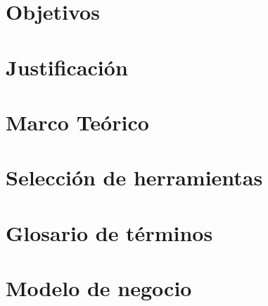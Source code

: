 \documentclass[10pt]{book}
\begin{document}
\chapter{Objetivos}\label{chp:objetivos}

\chapter{Justificación}\label{chp:justificacion}

\chapter{Marco Teórico}\label{chp:marcoTeo}

\chapter{Selección de herramientas}\label{chp:seleccionHerramientas}

\chapter{Glosario de términos}\label{chp:glosarioTerminos}


\chapter{Modelo de negocio}\label{chp:modeloNegocios} 
\end{document}
